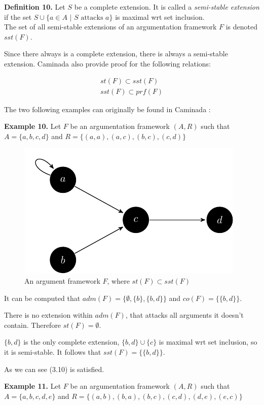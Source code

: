 \documentclass[draft,final]{vutinfth} %
\newcommand{\hl}{\par\vspace{6pt}} %
\newcommand{\cl}{\par\vspace{12pt}} %
\begin{document}
\textbf{Definition 10.} Let $S$ be a complete extension. It is called a \emph{semi-stable extension} if the set $S\cup\{a\in A\text{ | } S\text{ attacks }a\}$ is maximal wrt set inclusion.\\
The set of all semi-stable extensions of an argumentation framework $F$ is denoted $sst(F)$.\hl

Since there always is a complete extension, there is always a semi-stable extension. Caminada \cite{Caminada} also provide proof for the following relations: %


\begin{align}
	st(F)\subset sst(F)\\
	sst(F)\subset prf(F)
\end{align}\cl

The two following examples can originally be found in Caminada \cite{Caminada}:\hl

\textbf{Example 10.} Let $F$ be an argumentation framework $(A,R)$ such that $A=\{a,b,c,d\}$ and $R=\{(a,a),(a,c),(b,c),(c,d)\}$\hl

\FloatBarrier
	\begin{figure}[!h]
		\centering
		\includegraphics[scale=1.5]{graphs/ex4.pdf}
		\caption{An argument framework $F$, where $st(F)\subset sst(F)$}
	\end{figure}
\FloatBarrier

It can be computed that $adm(F)=\{\emptyset,\{b\},\{b,d\}\}$ and $co(F)=\{\{b,d\}\}$.\hl
There is no extension within $adm(F)$, that attacks all arguments it doesn't contain. Therefore $st(F)=\emptyset$.\hl
$\{b,d\}$ is the only complete extension, $\{b,d\}\cup \{c\}$ is maximal wrt set inclusion, so it is semi-stable. It follows that $sst(F)=\{\{b,d\}\}$.\hl
As we can see (3.10) is satisfied.\cl

\textbf{Example 11.} Let $F$ be an argumentation framework $(A,R)$ such that $A=\{a,b,c,d,e\}$ and $R=\{(a,b),(b,a),(b,c),(c,d),(d,e),(e,c)\}$\hl
\end{document}
